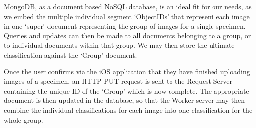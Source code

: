 \documentclass[a4paper,11pt]{article}
\begin{document}
\begin{description}
\hspace{5 mm} MongoDB, as a document based NoSQL database, is an ideal fit for our needs, as we embed the multiple individual segment `ObjectIDs' that represent each image in one `super' document representing the group of images for a single specimen. Queries and updates can then be made to all documents belonging to a group, or to individual documents within that group. We may then store the ultimate classification against the `Group' document.

\hspace{5 mm} Once the user confirms via the iOS application that they have finished uploading images of a specimen, an HTTP PUT request is sent to the Request Server containing the unique ID of the `Group' which is now complete. The appropriate document is then updated in the database, so that the Worker server may then combine the individual classifications for each image into one classification for the whole group.






\end{description}
\end{document}
